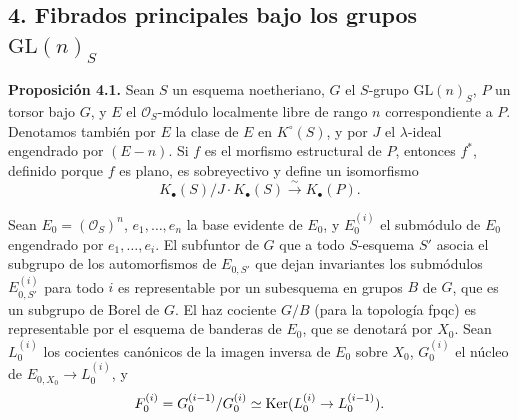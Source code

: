 \subsection*{4. Fibrados principales bajo los grupos $\mathrm{GL}(n)_S$}

\textbf{Proposición 4.1.} Sean $S$ un esquema noetheriano, $G$ el $S$-grupo $\mathrm{GL}(n)_S$, $P$ un torsor bajo $G$, y $E$ el $\mathcal O_S$-módulo localmente libre de rango $n$ correspondiente a $P$. Denotamos también por $E$ la clase de $E$ en $K^\circ(S)$, y por $J$ el $\lambda$-ideal engendrado por $(E-n)$. Si $f$ es el morfismo estructural de $P$, entonces $f^*$, definido porque $f$ es plano, es sobreyectivo y define un isomorfismo
\[
K_\bullet(S)/J\cdot K_\bullet(S)\xrightarrow{\sim}K_\bullet(P).
\]

Sean $E_0=(\mathcal O_S)^n$, $e_1,\ldots,e_n$ la base evidente de $E_0$, y $E_0^{(i)}$ el submódulo de $E_0$ engendrado por $e_1,\ldots,e_i$. El subfuntor de $G$ que a todo $S$-esquema $S'$ asocia el subgrupo de los automorfismos de $E_{0,S'}$ que dejan invariantes los submódulos $E_{0,S'}^{(i)}$ para todo $i$ es representable por un subesquema en grupos $B$ de $G$, que es un subgrupo de Borel de $G$. El haz cociente $G/B$ (para la topología fpqc) es representable por el esquema de banderas de $E_0$, que se denotará por $X_0$. Sean $L_0^{(i)}$ los cocientes canónicos de la imagen inversa de $E_0$ sobre $X_0$, $G_0^{(i)}$ el núcleo de $E_{0,X_0}\to L_0^{(i)}$, y
\[
F_0^{(i)}=G_0^{(i-1)}/G_0^{(i)}\simeq \operatorname{Ker}(L_0^{(i)}\to L_0^{(i-1)}).
\]

